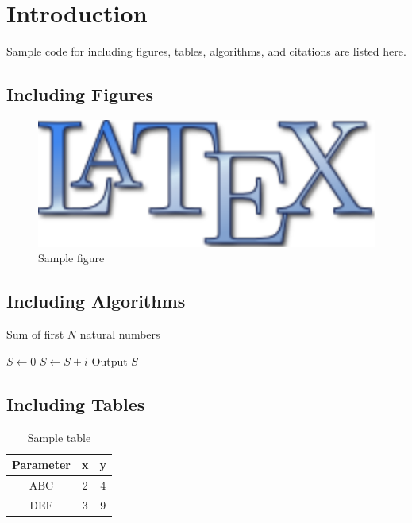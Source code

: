 \chapter{Introduction}\label{ch:introduction}

Sample code for including figures, tables, algorithms, and citations
are listed here.

\section{Including Figures}\label{sec:figures}
\begin{figure}[h]
	\centering
	\includegraphics[scale=0.15]{figures/latexlogo.pdf}
	\caption{Sample figure}
	\label{fig:latexlogo}
\end{figure}

\section{Including Algorithms}\label{sec:algorithms}
\begin{algorithm}[h]
	\caption{Sum of first $N$ natural numbers}
	\begin{algorithmic}[1]
		\State $S \leftarrow 0$
			\State $ S \leftarrow S + i $
		\EndFor{}
		\State Output $S$
	\end{algorithmic}
	\label{alg:sum}
\end{algorithm}

\section{Including Tables}\label{sec:tables}
\begin{table}[H]
	\centering
	\caption{Sample table}
	\begin{tabular}{| c | c | c |}\hline
	\textbf{Parameter} & \textbf{x} & \textbf{y} \\\hline\hline
	ABC & 2 & 4 \\\hline
	DEF & 3 & 9 \\\hline	
	\end{tabular}
\end{table}

